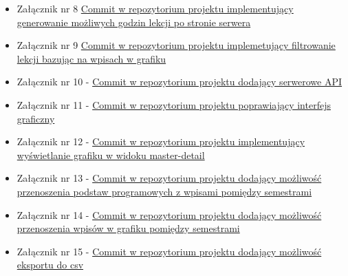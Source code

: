 \documentclass[12pt,a4paper,oneside]{article}
\theoremstyle{definition}
\numberwithin{equation}{section}
\begin{document}
\begin{itemize}
\item Załącznik nr 8 \href{https://github.com/lukaszgo1/engineering_project_2022/commit/60bd08e510a6b5598f768242a879fa3ee13644ea}{Commit w repozytorium projektu implementujący generowanie możliwych godzin lekcji po stronie serwera}
\item Załącznik nr 9 \href{https://github.com/lukaszgo1/engineering_project_2022/commit/1594029c9db0f9ae554b0fe906565e62a55aab31}{Commit w repozytorium projektu implemetujący filtrowanie lekcji bazując na wpisach w grafiku}
\item Załącznik nr 10 - \href{https://github.com/lukaszgo1/engineering_project_2022/commit/479b4b65ee9b45367f5e7985e87f001f8d60647b}{Commit w repozytorium projektu dodający serwerowe API}
\item Załącznik nr 11 - \href{https://github.com/lukaszgo1/engineering_project_2022/commit/9842bde11c168d8dacb7b31f03c153d7a1c860ab}{Commit w repozytorium projektu poprawiający interfejs graficzny}
\item Załącznik nr 12 - \href{https://github.com/lukaszgo1/engineering_project_2022/commit/53bd0562dd965e03288110a23f2c0e64c3819d69}{Commit w repozytorium projektu implementujący wyświetlanie grafiku w widoku master-detail}
\item Załącznik nr 13 - \href{https://github.com/lukaszgo1/engineering_project_2022/commit/6de614c476dc4f8532b835665cd36c029f43980f}{Commit w repozytorium projektu dodający możliwość przenoszenia podstaw programowych z wpisami pomiędzy semestrami}
\item Załącznik nr 14 - \href{https://github.com/lukaszgo1/engineering_project_2022/commit/29fdef6a99f6d53d65ed517fe1d4f195728598c1}{Commit w repozytorium projektu dodający możliwość przenoszenia wpisów w grafiku pomiędzy semestrami}
\item Załącznik nr 15 - \href{https://github.com/lukaszgo1/engineering_project_2022/commit/c5ebee19c096eceb62118d0d7a4f2df3691063be}{Commit w repozytorium projektu dodający możliwość eksportu do csv}
\end{itemize}



\renewcommand\refname{Literatura (jeżeli wymagana)}

\end{document}

